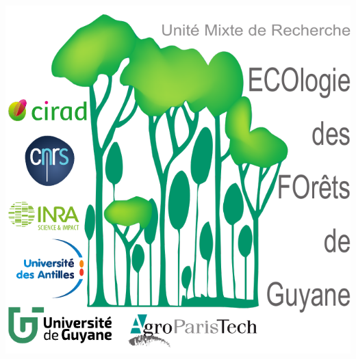\documentclass[
  11pt,
  french,
  a4paper,
  extrafontsizes,onecolumn,openright
  ]{memoir}
\begin{document}
\vspace*{\fill}
\centering\includegraphics[width=.3\textwidth]{images/logo}
\end{document}
